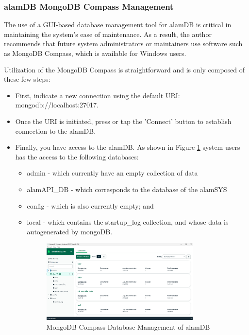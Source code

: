 \subsubsection{alamDB MongoDB Compass Management}
\label{subsubsec:alamBB_docker_management}
The use of a GUI-based database management tool for alamDB is critical 
in maintaining the system's ease of maintenance. As a result, the author 
recommends that future system administrators or maintainers use software 
such as MongoDB Compass, which is available for Windows users.

Utilization of the MongoDB Compass is straightforward and is only composed of
these few steps:
\begin{itemize}
    \item[(a)] First, indicate a new connection using the default URI: 
    mongodb://localhost:27017.
    \item[(b)] Once the URI is initiated, press or tap the 'Connect' button
    to establish connection to the alamDB.
    \item[(c)] Finally, you have access to the alamDB. As shown in Figure
    \ref{fig:mongodb_compass} system users has the access to the following databases:
    \begin{itemize}
        \item[1.] admin - which currently have an empty collection of data
        \item[2.] alamAPI\_DB - which corresponds to the database of the alamSYS
        \item[3.] config - which is also currently empty; and 
        \item[4.] local - which contains the startup\_log collection, and whose data is autogenerated by mongoDB.
        \begin{figure}[ht]
            \centering
            \includegraphics[width=0.80\textwidth]{./assets/Chapter_4/Documentation/mongodb_compass.png}
            \caption{MongoDB Compass Database Management of alamDB}
            \label{fig:mongodb_compass}
        \end{figure}
        \FloatBarrier
    \end{itemize}
\end{itemize}